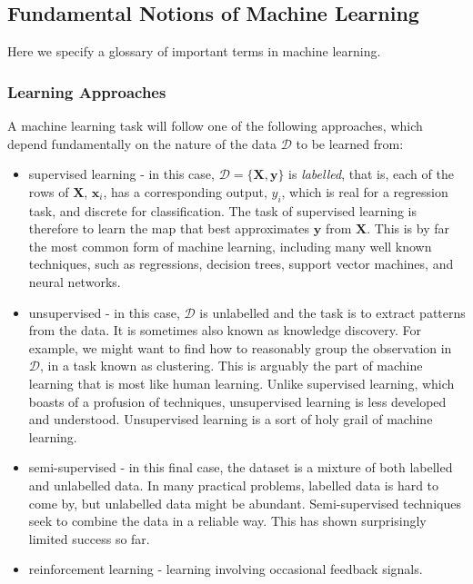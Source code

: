 \documentclass[11pt]{amsart}
\begin{document}
\subsection{Fundamental Notions of Machine Learning}

Here we specify a glossary of important terms in machine learning.

\subsubsection{Learning Approaches}

A machine learning task will follow one of the following approaches, which depend fundamentally on the nature of the data $\mathcal{D}$ to be learned from:

\begin{itemize}
\item supervised learning - in this case, $\mathcal{D} = \{\mathbf{X}, \mathbf{y}\}$ is \emph{labelled}, that is, each of the rows of $\mathbf{X}$, $\mathbf{x}_i$, has a corresponding output, $y_i$, which is real for a regression task, and discrete for classification. The task of supervised learning is therefore to learn the map that best approximates $\mathbf{y}$ from $\mathbf{X}$. This is by far the most common form of machine learning, including many well known techniques, such as regressions, decision trees, support vector machines, and neural networks.
\item unsupervised - in this case, $\mathcal{D}$ is unlabelled and the task is to extract patterns from the data. It is sometimes also known as knowledge discovery. For example, we might want to find how to reasonably group the observation in $\mathcal{D}$, in a task known as clustering. This is arguably the part of machine learning that is most like human learning. Unlike supervised learning, which boasts of a profusion of techniques, unsupervised learning is less developed and understood. Unsupervised learning is a sort of holy grail of machine learning.
\item semi-supervised - in this final case, the dataset is a mixture of both labelled and unlabelled data. In many practical problems, labelled data is hard to come by, but unlabelled data might be abundant. Semi-supervised techniques seek to combine the data in a reliable way. This has shown surprisingly limited success so far.
\item reinforcement learning - learning involving occasional feedback signals.
\end{itemize}
\end{document}
